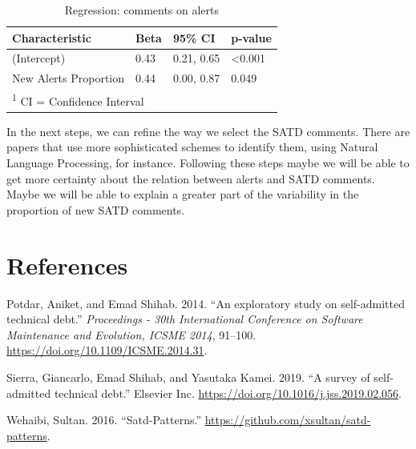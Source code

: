 \documentclass[
]{article}
\begin{document}
\small

\begin{table}

\caption{\label{tab:unnamed-chunk-23}\label{tab_reg} Regression: comments on alerts}
\centering
\begin{tabular}[t]{l|l|l|l}
\hline
Characteristic & Beta & 95\% CI & p-value\\
\hline
(Intercept) & 0.43 & 0.21, 0.65 & <0.001\\
\hline
New Alerts Proportion & 0.44 & 0.00, 0.87 & 0.049\\
\hline
\multicolumn{4}{l}{\textsuperscript{1} CI = Confidence Interval}\\
\end{tabular}
\end{table}

\normalsize

In the next steps, we can refine the way we select the SATD comments.
There are papers that use more sophisticated schemes to identify them,
using Natural Language Processing, for instance. Following these steps
maybe we will be able to get more certainty about the relation between
alerts and SATD comments. Maybe we will be able to explain a greater
part of the variability in the proportion of new SATD comments.


\section{References}

%
%

\hypertarget{refs}{}
\leavevmode\hypertarget{ref-Potdar2014}{}%
Potdar, Aniket, and Emad Shihab. 2014. ``An exploratory study on
self-admitted technical debt.'' \emph{Proceedings - 30th International
Conference on Software Maintenance and Evolution, ICSME 2014}, 91--100.
\url{https://doi.org/10.1109/ICSME.2014.31}.

\noindent
\leavevmode\hypertarget{ref-Sierra2019}{}%
Sierra, Giancarlo, Emad Shihab, and Yasutaka Kamei. 2019. ``A survey of
self-admitted technical debt.'' Elsevier Inc.
\url{https://doi.org/10.1016/j.jss.2019.02.056}.

\noindent
\leavevmode\hypertarget{ref-Wehaibi2016}{}%
Wehaibi, Sultan. 2016. ``Satd-Patterns.''
\url{https://github.com/xsultan/satd-patterns}.
\end{document}

